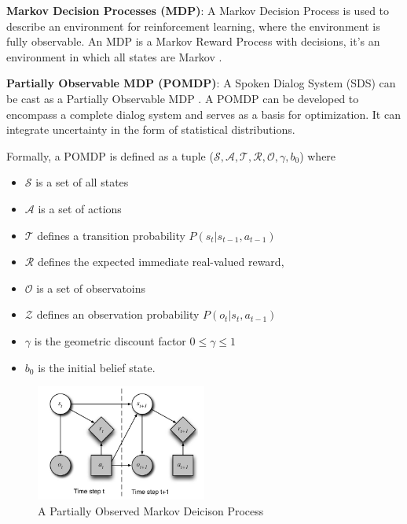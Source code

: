 \documentclass[11pt,a4paper]{article}
\begin{document}
\noindent \textbf{Markov Decision Processes (MDP)}: A Markov Decision Process is used to describe an environment for reinforcement learning, where the environment is fully observable. An MDP is a Markov Reward Process with decisions, it’s an environment in which all states are Markov \cite{Sutton1999BetweenMA}. 

\medskip \noindent \textbf{Partially Observable MDP (POMDP)}: A Spoken Dialog System (SDS) can be cast as a Partially Observable MDP \cite{Williams2007PartiallyOM, Young2013POMDPBasedSS}. A POMDP can be developed to encompass a complete dialog system and serves as a basis for optimization. It can integrate uncertainty in the form of statistical distributions.

Formally, a POMDP is defined as a tuple ($\mathcal{S}, \mathcal{A}, \mathcal{T}, \mathcal{R}, \mathcal{O}, \gamma, b_0$) where 

\begin{itemize}[leftmargin=*]
  \setlength\itemsep{0em}
  \item $\mathcal{S}$ is a set of all states
  \item $\mathcal{A}$ is a set of actions
  \item $\mathcal{T}$ defines a transition probability $P(s_t|s_{t-1}, a_{t-1})$
  \item $\mathcal{R}$ defines the expected immediate real-valued reward, \item $\mathcal{O}$ is a set of observatoins
  \item $\mathcal{Z}$ defines an observation probability $P(o_t|s_t, a_{t-1})$
  \item $\gamma$ is the geometric discount factor $0 \leq \gamma \leq 1$
  \item $b_0$ is the initial belief state.
\end{itemize}

\begin{figure}[h]
  \centering
  \includegraphics[width=0.5\textwidth]{images/pomdp.png}
  \caption{A Partially Observed Markov Deicison Process}
\end{figure}
\end{document}
